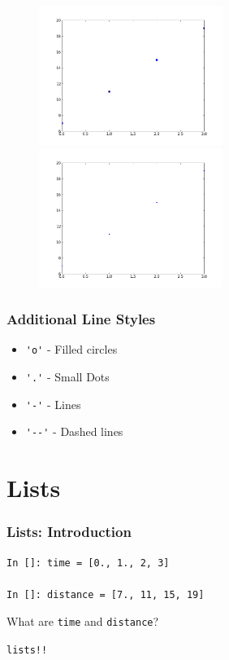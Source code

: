 \documentclass[14pt,compress]{beamer}
\newcounter{time}
\newcommand{\typ}[1]{\lstinline{#1}}
\begin{document}
\begin{frame}[fragile]
\begin{figure}
\includegraphics[interpolate=true,width=2.35in]{data/stline_dots.png}
\includegraphics[interpolate=true,width=2.35in]{data/stline_points.png}
\end{figure}
\end{frame}

\begin{frame}[fragile]
\frametitle{Additional Line Styles}
\begin{itemize}
  \item \typ{'o'} - Filled circles
  \item \typ{'.'} - Small Dots
  \item \typ{'-'} - Lines
  \item \typ{'--'} - Dashed lines
\end{itemize}
\end{frame}

\section{Lists}
\begin{frame}[fragile]
  \frametitle{Lists: Introduction}
  \begin{lstlisting}
In []: time = [0., 1., 2, 3]

In []: distance = [7., 11, 15, 19]
  \end{lstlisting}
What are \typ{time} and \typ{distance}?\\
\begin{center}
  \large
\alert{\typ{lists!!}}
\end{center}
\end{frame}
\end{document}
